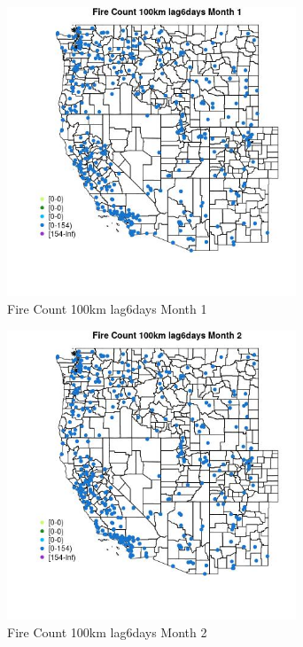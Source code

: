 \begin{figure} 
\centering  
\includegraphics[width=0.77\textwidth]{Code_Outputs/Report_ML_input_PM25_Step4_part_e_de_duplicated_aves_compiled_2019-05-18wNAs_MapObsMo1Fire_Count_100km_lag6days.jpg} 
\caption{\label{fig:Report_ML_input_PM25_Step4_part_e_de_duplicated_aves_compiled_2019-05-18wNAsMapObsMo1Fire_Count_100km_lag6days}Fire Count 100km lag6days Month 1} 
\end{figure} 
 

\begin{figure} 
\centering  
\includegraphics[width=0.77\textwidth]{Code_Outputs/Report_ML_input_PM25_Step4_part_e_de_duplicated_aves_compiled_2019-05-18wNAs_MapObsMo2Fire_Count_100km_lag6days.jpg} 
\caption{\label{fig:Report_ML_input_PM25_Step4_part_e_de_duplicated_aves_compiled_2019-05-18wNAsMapObsMo2Fire_Count_100km_lag6days}Fire Count 100km lag6days Month 2} 
\end{figure} 
 

